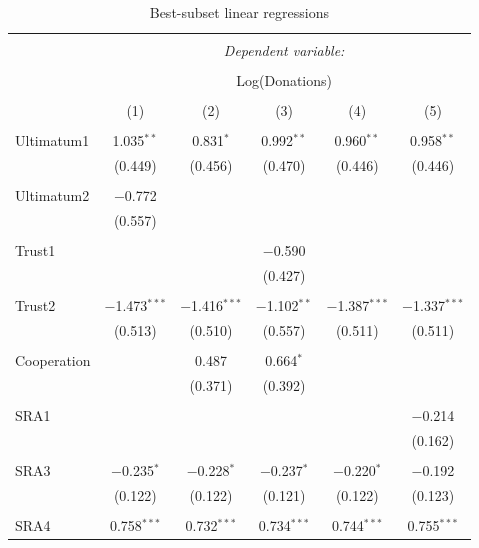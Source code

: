 \documentclass[12pt]{article}
\begin{document}
\begin{table}[!htbp] \centering 
  \caption{Best-subset linear regressions} 
  \label{} 
  \begin{adjustbox}{width=\textwidth}
\begin{tabular}{@{\extracolsep{5pt}}lccccc} 
\\[-1.8ex]\hline 
\hline \\[-1.8ex] 
 & \multicolumn{5}{c}{\textit{Dependent variable:}} \\ 
\cline{2-6} 
\\[-1.8ex] & \multicolumn{5}{c}{Log(Donations)} \\ 
\\[-1.8ex] & (1) & (2) & (3) & (4) & (5)\\ 
\hline \\[-1.8ex] 
 Ultimatum1 & 1.035$^{**}$ & 0.831$^{*}$ & 0.992$^{**}$ & 0.960$^{**}$ & 0.958$^{**}$ \\ 
  & (0.449) & (0.456) & (0.470) & (0.446) & (0.446) \\ 
  & & & & & \\ 
 Ultimatum2 & $-$0.772 &  &  &  &  \\ 
  & (0.557) &  &  &  &  \\ 
  & & & & & \\ 
 Trust1 &  &  & $-$0.590 &  &  \\ 
  &  &  & (0.427) &  &  \\ 
  & & & & & \\ 
 Trust2 & $-$1.473$^{***}$ & $-$1.416$^{***}$ & $-$1.102$^{**}$ & $-$1.387$^{***}$ & $-$1.337$^{***}$ \\ 
  & (0.513) & (0.510) & (0.557) & (0.511) & (0.511) \\ 
  & & & & & \\ 
 Cooperation &  & 0.487 & 0.664$^{*}$ &  &  \\ 
  &  & (0.371) & (0.392) &  &  \\ 
  & & & & & \\ 
 SRA1 &  &  &  &  & $-$0.214 \\ 
  &  &  &  &  & (0.162) \\ 
  & & & & & \\ 
 SRA3 & $-$0.235$^{*}$ & $-$0.228$^{*}$ & $-$0.237$^{*}$ & $-$0.220$^{*}$ & $-$0.192 \\ 
  & (0.122) & (0.122) & (0.121) & (0.122) & (0.123) \\ 
  & & & & & \\ 
 SRA4 & 0.758$^{***}$ & 0.732$^{***}$ & 0.734$^{***}$ & 0.744$^{***}$ & 0.755$^{***}$ \\ 

\end{tabular}
\end{adjustbox}
\end{table}
\end{document}
